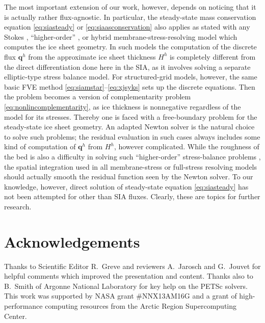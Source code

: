 \documentclass[review,letterpaper]{igs}
\newcommand\bq{\mathbf{q}}
\begin{document}
The most important extension of our work, however, depends on noticing that it is actually rather flux-agnostic.  In particular, the steady-state mass conservation equation \eqref{eq:siasteady} or \eqref{eq:siaasconservation} also applies as stated with any Stokes \citep{GreveBlatter2009}, ``higher-order'' \citep{Pattynetal2008}, or hybrid membrane-stress-resolving \citep{Winkelmannetal2011} model which computes the ice sheet geometry.  In such models the computation of the discrete flux $\bq^h$ from the approximate ice sheet thickness $H^h$ is completely different from the direct differentiation done here in the SIA, as it involves solving a separate elliptic-type stress balance model.  For structured-grid models, however, the same basic FVE method \eqref{eq:siamstar}--\eqref{eq:xjsyks} sets up the discrete equations.  Then the problem becomes a version of complementarity problem \eqref{eq:nonlincomplementarity}, as ice thickness is nonnegative regardless of the model for its stresses.  Thereby one is faced with a free-boundary problem for the steady-state ice sheet geometry.  An adapted Newton solver is the natural choice to solve such problems; the residual evaluation in such cases always includes some kind of computation of $\bq^h$ from $H^h$, however complicated.  While the roughness of the bed is also a difficulty in solving such ``higher-order'' stress-balance problems \citep{BrownSmithAhmadia2013}, the spatial integration used in all membrane-stress or full-stress resolving models should actually smooth the residual function seen by the Newton solver.  To our knowledge, however, direct solution of steady-state equation \eqref{eq:siasteady} has not been attempted for other than SIA fluxes.  Clearly, these are topics for further research.


\section*{Acknowledgements}
Thanks to Scientific Editor R.~Greve and reviewers A.~Jarosch and G.~Jouvet for helpful comments which improved the presentation and content.  Thanks also to B.~Smith of Argonne National Laboratory for key help on the PETSc solvers.  This work was supported by NASA grant \#NNX13AM16G and a grant of high-performance computing resources from the Arctic Region Supercomputing Center.



%
%
\end{document}
